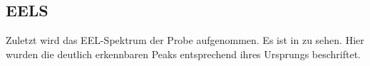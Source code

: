   \subsection{EELS}

  Zuletzt wird das EEL-Spektrum der Probe aufgenommen.
  Es ist in zu sehen. %
  Hier wurden die deutlich erkennbaren Peaks entsprechend ihres Ursprungs beschriftet.
